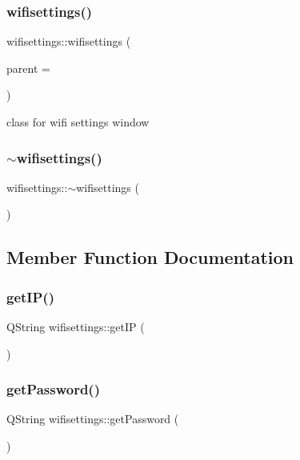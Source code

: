 \subsubsection{\texorpdfstring{wifisettings()}{wifisettings()}}
{\footnotesize\ttfamily wifisettings\+::wifisettings (\begin{DoxyParamCaption}\item[{Q\+Widget $\ast$}]{parent = {} }\end{DoxyParamCaption})\hspace{0.3cm}{\ttfamily [explicit]}}

class for wifi settings window \mbox{\label{classwifisettings_ae88cdd7ff53ff553f4a8eba0a1dc7aa7}} 
\subsubsection{\texorpdfstring{$\sim$wifisettings()}{~wifisettings()}}
{\footnotesize\ttfamily wifisettings\+::$\sim$wifisettings (\begin{DoxyParamCaption}{ }\end{DoxyParamCaption})}



\subsection{Member Function Documentation}
\mbox{\label{classwifisettings_a891601a5caa4148003dcb0d946052b70}} 
\subsubsection{\texorpdfstring{get\+I\+P()}{getIP()}}
{\footnotesize\ttfamily Q\+String wifisettings\+::get\+IP (\begin{DoxyParamCaption}{ }\end{DoxyParamCaption})}

\mbox{\label{classwifisettings_a7ecb69434e89086e1d37158ce8187274}} 
\subsubsection{\texorpdfstring{get\+Password()}{getPassword()}}
{\footnotesize\ttfamily Q\+String wifisettings\+::get\+Password (\begin{DoxyParamCaption}{ }\end{DoxyParamCaption})}


